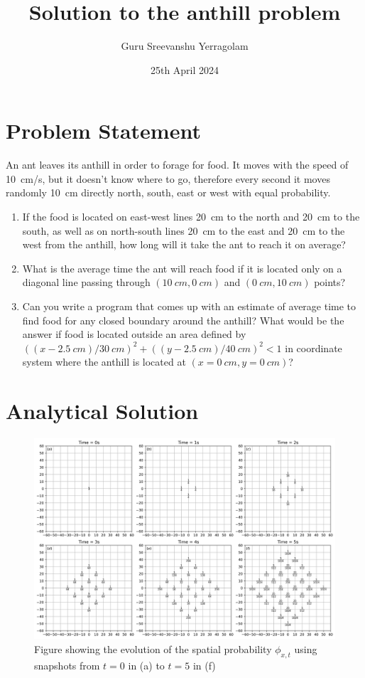 \documentclass[11pt, a4paper]{article}
\begin{document}
\title{Solution to the anthill problem}
\date{25th April 2024}
\author{Guru Sreevanshu Yerragolam}
\maketitle

\section{Problem Statement}

An ant leaves its anthill in order to forage for food. It moves with the speed of \SI{10}{cm/s}, but it doesn't know where to go, therefore every second it moves randomly \SI{10}{cm} directly north, south, east or west with equal probability.

\begin{enumerate}
    \item If the food is located on east-west lines \SI{20}{cm} to the north and \SI{20}{cm} to the south, as well as on north-south lines \SI{20}{cm} to the east and \SI{20}{cm} to the west from the anthill, how long will it take the ant to reach it on average?
    \item What is the average time the ant will reach food if it is located only on a diagonal line passing through $(\SI{10}{cm}, \SI{0}{cm})$ and $(\SI{0}{cm}, \SI{10}{cm})$ points?
    \item Can you write a program that comes up with an estimate of average time to find food for any closed boundary around the anthill? What would be the answer if food is located outside an area defined by $\left( (x - \SI{2.5}{cm}) / \SI{30}{cm} \right)^2 + \left( (y - \SI{2.5}{cm}) / \SI{40}{cm} \right)^2 < 1$ in coordinate system where the anthill is located at $(x = \SI{0}{cm}, y = \SI{0}{cm})$?
\end{enumerate}

\section{Analytical Solution}

\begin{figure}
    \includegraphics[width=\textwidth]{../Code/fig1.png}
    \caption{Figure showing the evolution of the spatial probability $\phi_{x,t}$ using snapshots from $t=0$ in (a) to $t=5$ in (f)}
    \label{fig1}
\end{figure}
\end{document}
